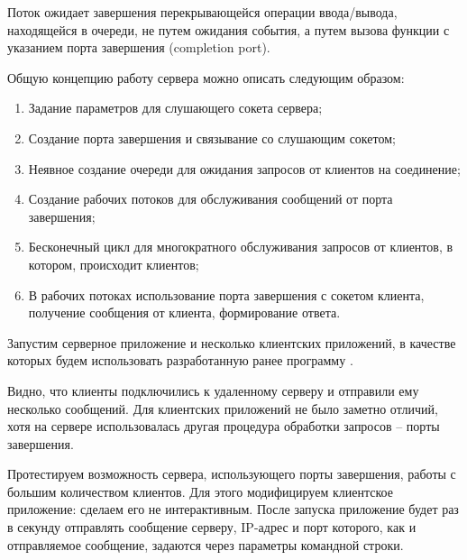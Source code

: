Поток ожидает завершения перекрывающейся операции ввода/вывода, находящейся в очереди, не путем ожидания события, а путем вызова функции  с указанием порта завершения (completion port).

Общую концепцию работу сервера можно описать следующим образом:
\begin{enumerate}
	\item Задание параметров для слушающего сокета сервера;
	\item Создание порта завершения и связывание со слушающим сокетом;
	\item Неявное создание очереди для ожидания запросов от клиентов на соединение;
	\item Создание рабочих потоков для обслуживания сообщений от порта завершения;
	\item Бесконечный цикл для многократного обслуживания запросов от клиентов, в котором, происходит  клиентов; 
	\item В рабочих потоках использование порта завершения с сокетом клиента, получение сообщения от клиента, формирование ответа.
\end{enumerate}



Запустим серверное приложение  и несколько клиентских приложений, в качестве которых будем использовать разработанную ранее программу .







Видно, что клиенты подключились к удаленному серверу и отправили ему несколько сообщений. Для клиентских приложений не было заметно отличий, хотя на сервере использовалась другая процедура обработки запросов -- порты завершения.

Протестируем возможность сервера, использующего порты завершения, работы с большим количеством клиентов. Для этого модифицируем клиентское приложение: сделаем его не интерактивным. После запуска приложение будет раз в секунду отправлять сообщение серверу, IP-адрес и порт которого, как и отправляемое сообщение, задаются через параметры командной строки.

